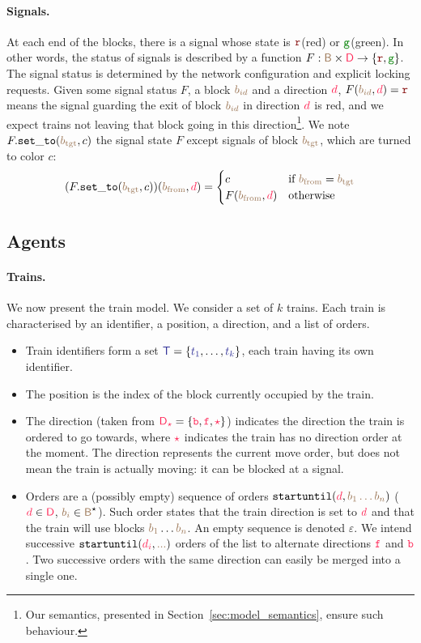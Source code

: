 \documentclass[runningheads]{llncs}
\newcommand{\directions}{\dirFmt{\mathsf{D}}}
\newcommand{\forward}{\ensuremath{\mathtt{f}}}
\newcommand{\backward}{\ensuremath{\mathtt{b}}\xspace}
\newcommand{\dirFmt}[1]{{\color{dircolor} #1}}
\newcommand{\dirForward}{\ensuremath{\dirFmt{\forward}}\xspace}
\newcommand{\dirBackward}{\ensuremath{\dirFmt{\backward}}\xspace}
\newcommand{\dirStop}{\ensuremath{\dirFmt{\star}}\xspace}
\newcommand{\posFmt}[1]{{\color{poscolor}{#1}}}
\newcommand{\blocks}{{\posFmt{\mathsf{B}}}}
\newcommand{\bid}[1]{\ensuremath{\posFmt{b_{#1}}}}
\newcommand{\trainFmt}[1]{{\color{traincolor} #1}}
\newcommand{\trains}{{\trainFmt{\mathsf{T}}}}
\newcommand{\tid}[1]{\ensuremath{\trainFmt{t_{#1}}}}
\newcommand{\su}[2]{{\mbox{$\mathtt{startuntil}(\dirFmt{#1}, \posFmt{#2})$}}\xspace}
\newcommand{\emptyTrainProg}{\varepsilon}
\newcommand{\sigred}{{\mbox{${\color{red!50!black}\mathtt{r}}$}}\xspace}
\newcommand{\siggreen}{{\mbox{${\color{green!50!black}\mathtt{g}}$}}\xspace}
\newcommand{\signalF}[2]{\ensuremath{\signals(\posFmt{#1}, \dirFmt{#2})}}
\newcommand{\signals}{\ensuremath{F}}
\newcommand{\setSignalsTo}[2]{\signals.{\tt set\_to}(#1, #2)}
\begin{document}
\paragraph{Signals.}
At each end of the blocks, there is a signal whose state is \sigred (red) or \siggreen (green). In other words, the status of signals is described by a function $\signals: \blocks \times \directions \to \{ \sigred, \siggreen\}$. The signal status is determined by the network configuration and explicit locking requests. Given some signal status $\signals$, a block $\bid{id}$ and a direction $\dirFmt{d}$, $\signalF{\bid{id}}{d} = \sigred$ means the signal guarding the exit of block $\bid{id}$ in direction $\dirFmt{d}$ is red, and we expect trains not leaving that block going in this direction\footnote{Our semantics, presented in Section~\ref{sec:model_semantics}, ensure such behaviour.}. We note $\setSignalsTo{\bid{\text{tgt}}}{c}$ the signal state $\signals$ except signals of block \bid{\text{tgt}}, which are turned to color $c$: 
$$(\setSignalsTo{\bid{\text{tgt}}}{c})(\bid{\text{from}}, \dirFmt{d}) = \begin{cases}
	c & \text{if }\bid{\text{from}} = \bid{\text{tgt}}\\
	\signalF{\bid{\text{from}}}{d} & \text{otherwise}
\end{cases}$$


\subsection{Agents}
\paragraph{Trains.}
We now present the train model. We consider a set of $k$ trains. 
Each train is characterised by an identifier, a position, a direction, and a list of orders.
\begin{itemize}
	\item Train identifiers form a set  $\trains = \{\tid{1}, \ldots, \tid{k}\}$, each train having its own identifier.
	\item The position is the index of the block currently occupied by the train.
	\item The direction (taken from $\directions_\dirStop = \{\dirBackward, \dirForward, \dirStop\}$) indicates the direction the train is ordered to go towards, where \dirStop indicates the train has no direction order at the moment. The direction represents the current move order, but does not mean the train is actually moving: it can be blocked at a signal.
	\item Orders are a (possibly empty) sequence of orders $\su{d}{\bid{1}\dots\bid{n}}$ ($\dirFmt{d} \in \directions$, $\bid{i} \in \blocks^\star$). Such order states that the train direction is set to $\dirFmt{d}$ and that the train will use blocks $\bid{1}\dots\bid{n}$. An empty sequence is denoted $\emptyTrainProg$. We intend successive \su{d_i}{...} orders of the list to alternate directions \dirForward{} and \dirBackward{}. Two successive orders with the same direction can easily be merged into a single one.
\end{itemize}
\end{document}
